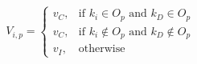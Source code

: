\documentclass[12pt]{article}
\begin{document}
\[
    V_{i,p} = 
	\begin{cases}
		v_C,& \text{if } k_i \in O_p \text{ and } k_D \in O_p\\
		v_C,& \text{if } k_i \notin O_p \text{ and } k_D \notin O_p\\
		v_I,& \text{otherwise}
	\end{cases}
\]
\end{document}

